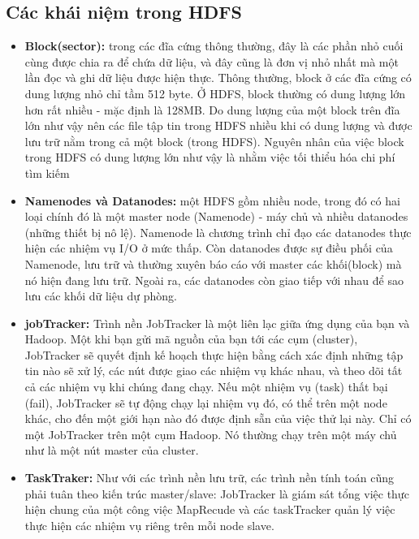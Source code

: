 \subsection{Các khái niệm trong HDFS}
\begin{itemize}
	\item \textbf{Block(sector): }trong các đĩa cứng thông thường, đây là các phần nhỏ cuối cùng được chia ra để chứa dữ liệu, và đây cũng là đơn vị nhỏ nhất mà một lần đọc và ghi dữ liệu được hiện thực. Thông thường, block ở các đĩa cứng có dung lượng nhỏ chỉ tầm 512 byte. Ở HDFS, block thường có dung lượng lớn hơn rất nhiều - mặc định là 128MB. Do dung lượng của một block trên đĩa lớn như vậy nên các file tập tin trong HDFS nhiều khi có dung lượng và được lưu trữ nằm trong cả một block (trong HDFS). Nguyên nhân của việc block trong HDFS có dung lượng lớn như vậy là nhằm việc tối thiểu hóa chi phí tìm kiếm \cite{hadoop-def}
	\item \textbf{Namenodes và Datanodes: }một HDFS gồm nhiều node, trong đó có hai loại chính đó là một master node (Namenode) - máy chủ và nhiều datanodes (những thiết bị nô lệ). Namenode là chương trình chỉ đạo các datanodes thực hiện các nhiệm vụ I/O ở mức thấp. Còn datanodes được sự điều phối của Namenode, lưu trữ và thường xuyên báo cáo với master các khối(block) mà nó hiện đang lưu trữ. Ngoài ra, các datanodes còn giao tiếp với nhau để sao lưu các khối dữ liệu dự phòng.
	\item \textbf{jobTracker: }Trình nền JobTracker là một liên lạc giữa ứng dụng của bạn và Hadoop. Một khi bạn gửi mã nguồn của bạn tới các cụm (cluster), JobTracker sẽ quyết định kế hoạch thực hiện bằng cách xác định những tập tin nào sẽ xử lý, các nút được giao các nhiệm vụ khác nhau, và theo dõi tất cả các nhiệm vụ khi chúng đang chạy. Nếu một nhiệm vụ (task) thất bại (fail), JobTracker sẽ tự động chạy lại nhiệm vụ đó, có thể trên một node khác, cho đến một giới hạn nào đó được định sẵn của việc thử lại này.
Chỉ có một JobTracker trên một cụm Hadoop. Nó thường chạy trên một máy chủ như là một nút master của cluster.
\item \textbf{TaskTraker: }Như với các trình nền lưu trữ, các trình nền tính toán cũng phải tuân theo kiến trúc master/slave: JobTracker là giám sát tổng việc thực hiện chung của một công việc MapRecude và các taskTracker quản lý việc thực hiện các nhiệm vụ riêng trên mỗi node slave.

\end{itemize}
